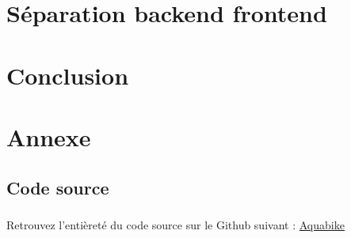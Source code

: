 \documentclass[12pt,oneside]{report}
\begin{document}
	\vspace{\baselineskip}
	

\chapter{Séparation backend frontend}
\label{chap:Séparation backend frontend}

	\vspace{\baselineskip}
	

\chapter{Conclusion}
\label{chap:Conclusion}

	\vspace{\baselineskip}
	

\newpage
\chapter{Annexe}
	 \label{chap:Annexe}
	
	\vspace{\baselineskip}
	\section{Code source}
		\paragraph{}
			Retrouvez l'entièreté du code source sur le Github suivant : \href{https://github.com/victorsmits/Aquabike}{Aquabike}
			
\end{document}
